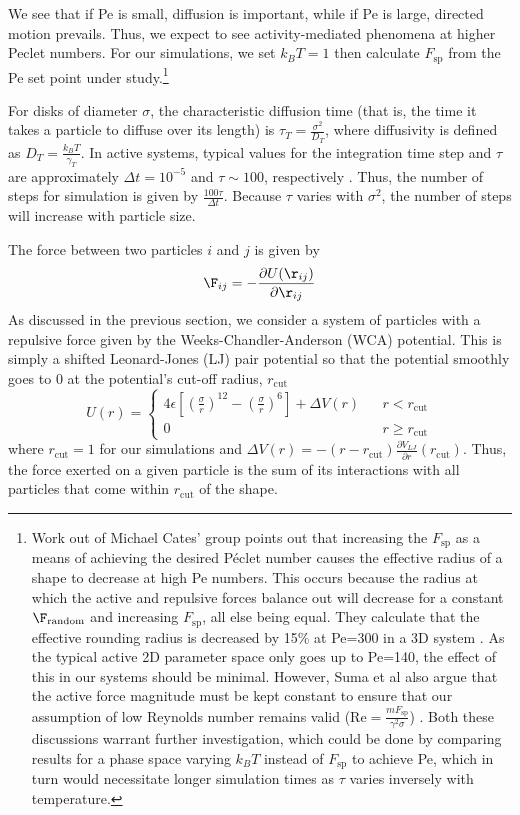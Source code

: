 We see that if Pe is small, diffusion is important, while if Pe is large, directed motion prevails. Thus, we expect to see activity-mediated phenomena at higher Peclet numbers. For our simulations, we set $k_BT=1$ then calculate $F_\text{sp}$ from the Pe set point under study.\footnote{Work out of Michael Cates' group points out that increasing the $F_\text{sp}$ as a means of achieving the desired P{\'e}clet number causes the effective radius of a shape to decrease at high Pe numbers. This occurs because the radius at which the active and repulsive forces balance out will decrease for a constant $\F_\text{random}$ and increasing $F_\text{sp}$, all else being equal. They calculate that the effective rounding radius is decreased by 15\% at Pe=300 in a 3D system \cite{Stenhammar_2014_SoftMatter}. As the typical active 2D parameter space only goes up to Pe=140, the effect of this in our systems should be minimal. However, Suma et al also argue that the active force magnitude must be kept constant to ensure that our assumption of low Reynolds number remains valid (Re$=\frac{mF_\text{sp}}{\gamma^2\sigma}$) \cite{Suma2014}. Both these discussions warrant further investigation, which could be done by comparing results for a phase space varying $k_BT$ instead of $F_\text{sp}$ to achieve Pe, which in turn would necessitate longer simulation times as $\tau$ varies inversely with temperature.}

For disks of diameter $\sigma$, the characteristic diffusion time (that is, the time it takes a particle to diffuse over its length) is $\tau_T = \frac{\sigma^2}{D_T}$, where diffusivity is defined as $D_T=\frac{k_BT}{\gamma_T}$. In active systems, typical values for the integration time step and $\tau$ are approximately ${\Delta}t=10^{-5}$ and $\tau\sim100$, respectively \cite{Prymidis_2016_SoftMatter, Redner_2013_PRL}. Thus, the number of steps for simulation is given by $\frac{100\tau}{{\Delta}t}$. Because $\tau$ varies with $\sigma^2$, the number of steps will increase with particle size.

The force between two particles $i$ and $j$ is given by
\begin{equation}
\F_{ij} = -\frac{\partial U(\r_{ij})}{\partial \r_{ij}}
\end{equation}
As discussed in the previous section, we consider a system of particles with a repulsive force given by the Weeks-Chandler-Anderson (WCA) potential. This is simply a shifted Leonard-Jones (LJ) pair potential so that the potential smoothly goes to 0 at the potential's cut-off radius, $r_\text{cut}$
\begin{equation}
U(r) = \left\{ \begin{aligned}
4{\epsilon}\left[\left(\frac{\sigma}{r}\right)^{12}-\left(\frac{\sigma}{r}\right)^6\right] + {\Delta}V(r) && r<r_\text{cut} \\
0 && r \geq r_\text{cut}
\end{aligned}
\right.
\end{equation}
where $r_\text{cut}=1$ for our simulations and ${\Delta} V(r) = -(r-r_\text{cut})\frac{\partial V_{LJ}}{\partial r}(r_\text{cut})$. Thus, the force exerted on a given particle is the sum of its interactions with all particles that come within $r_\text{cut}$ of the shape.

